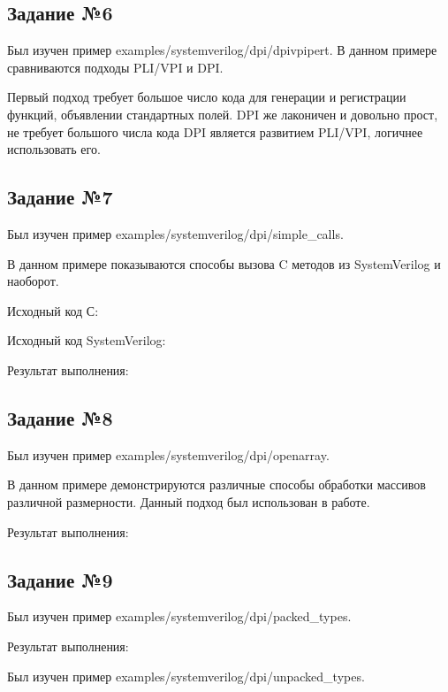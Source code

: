 \documentclass[a4paper,14pt]{article}
\begin{document}
	\subsection{Задание №6}
	
	Был изучен пример examples/systemverilog/dpi/dpivpipert.
	В данном примере сравниваются подходы PLI/VPI и DPI.
	
	Первый подход требует большое число кода для генерации и регистрации функций, объявлении стандартных полей.
	DPI же лаконичен и довольно прост, не требует большого числа кода
	DPI является развитием PLI/VPI, логичнее использовать его.
	
	\subsection{Задание №7}
	
	Был изучен пример examples/systemverilog/dpi/simple\_calls.
	
	В данном примере показываются способы вызова C методов из SystemVerilog и наоборот.
	
	Исходный код С:
	{\small {}}
	
	Исходный код SystemVerilog:
	{\small {}}
	
	Результат выполнения:
	{\small {}}
	
	\subsection{Задание №8}
	
	Был изучен пример examples/systemverilog/dpi/openarray.
	
	В данном примере демонстрируются различные способы обработки массивов различной размерности.
	Данный подход был использован в работе.
	
	Результат выполнения:
	{\small {}}
	
	\subsection{Задание №9}
	
	Был изучен пример examples/systemverilog/dpi/packed\_types.
	
	Результат выполнения:
	{\small {}}
	
	Был изучен пример examples/systemverilog/dpi/unpacked\_types.
	
\end{document}

